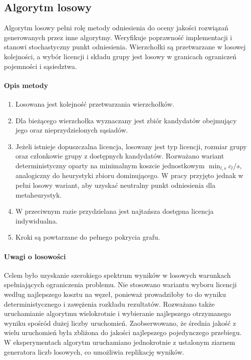 \subsection{Algorytm losowy}\label{subsec:random}

Algorytm losowy pełni rolę metody odniesienia do oceny jakości rozwiązań generowanych przez inne algorytmy. Weryfikuje poprawność implementacji i stanowi stochastyczny punkt odniesienia. Wierzchołki są przetwarzane w losowej kolejności, a wybór licencji i składu grupy jest losowy w granicach ograniczeń pojemności i sąsiedztwa.

\paragraph{Opis metody}
\begin{enumerate}
  \item Losowana jest kolejność przetwarzania wierzchołków.
  \item Dla bieżącego wierzchołka wyznaczany jest zbiór kandydatów obejmujący jego oraz nieprzydzielonych sąsiadów.
  \item Jeżeli istnieje dopuszczalna licencja, losowany jest typ licencji, rozmiar grupy oraz członkowie grupy z dostępnych kandydatów.
        Rozważano wariant deterministyczny oparty na minimalnym koszcie jednostkowym \(\min_{l,s} c_l/s\), analogiczny do heurystyki zbioru dominującego. W pracy przyjęto jednak w pełni losowy wariant, aby uzyskać neutralny punkt odniesienia dla metaheurystyk.
  \item W przeciwnym razie przydzielana jest najtańsza dostępna licencja indywidualna.
  \item Kroki są powtarzane do pełnego pokrycia grafu.
\end{enumerate}

\paragraph{Uwagi o losowości}
Celem było uzyskanie szerokiego spektrum wyników w losowych warunkach spełniających ograniczenia problemu.
Nie stosowano wariantu wyboru licencji według najlepszego kosztu na węzeł, ponieważ prowadziłoby to do wyniku deterministycznego i zawężenia rozkładu rezultatów.
Rozważano także uruchamianie algorytmu wielokrotnie i wybieranie najlepszego otrzymanego wyniku spośród dużej liczby uruchomień.
Zaobserwowano, że średnia jakość z wielu uruchomień była zbliżona do jakości najlepszego pojedynczego przebiegu.
W eksperymentach algorytm uruchamiano jednokrotnie z ustalonym ziarnem generatora liczb losowych, co umożliwia replikację wyników.

